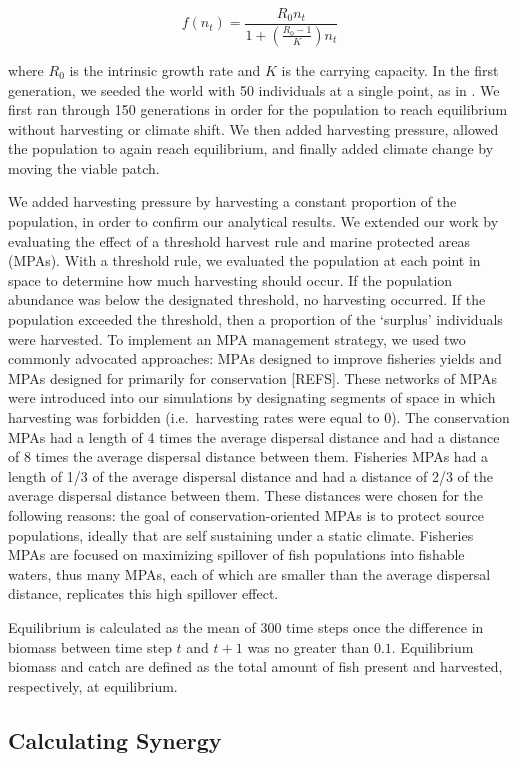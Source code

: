 \documentclass[12pt,english]{article}
\begin{document}
\begin{spacing}{1.9}
\begin{flushleft}
\[f(n_t)=\frac{R_0n_t}{1+\left(\frac{R_0-1}{K}\right)n_t}\]

\noindent where $R_0$ is the intrinsic growth rate and $K$ is the carrying capacity.  In the first generation, we seeded the world with 50 individuals at a single point, as in 
\citep{ZhouKot2011}. We first ran through 150 generations in order for the population to reach equilibrium without harvesting or climate shift.  We then 
added harvesting pressure, allowed the population to again reach equilibrium, and finally added climate 
change by moving the viable patch.

We added harvesting pressure by harvesting a constant proportion of the population, in order to confirm our analytical results. We extended our work by evaluating the effect of a threshold harvest rule and marine protected 
areas (MPAs). With a threshold rule, we evaluated the population at each point in space to determine how 
much harvesting should occur. If the population abundance was below the designated threshold, no 
harvesting occurred. If the population exceeded the threshold, then a proportion of the `surplus' individuals 
were harvested. To implement an MPA management strategy, we used two commonly advocated approaches: 
MPAs designed to improve fisheries yields and MPAs designed for primarily for conservation [REFS]. These networks 
of MPAs were introduced into our simulations by designating segments of space in which harvesting was 
forbidden (i.e.~harvesting rates were equal to $0$). The conservation MPAs had a length of 4 times the average 
dispersal distance and had a distance of 8 times the average dispersal distance between them. Fisheries MPAs had a length of 1/3 of the 
average dispersal distance and had a distance of 2/3 of the average dispersal distance between them. These distances were chosen for the following reasons: the goal of conservation-oriented MPAs is to protect source populations, ideally that are self sustaining under a static climate. Fisheries MPAs are focused on maximizing spillover of fish populations into fishable waters, thus many MPAs, each of which are smaller than the average dispersal distance, replicates this high spillover effect. 

Equilibrium is calculated as the mean of 300 time steps once the difference in biomass between time step $t$ and $t+1$ was no greater than $0.1$. Equilibrium biomass and catch are defined as the total amount of fish present and harvested, respectively, at equilibrium. 

\subsection{Calculating Synergy }


\end{flushleft}
\end{spacing}
\end{document}
